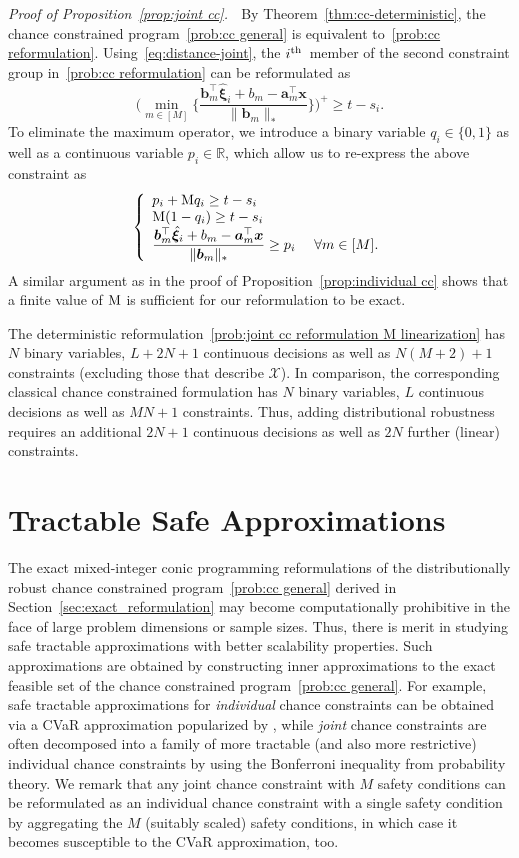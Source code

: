 \documentclass[nonblindrev]{informs2017}
\newcommand{\bmh}[1]{\hat{\bm{#1}}}
\newcommand{\1}[1]{\mathds{1}{\left(#1\right)}}
\begin{document}
\noindent \emph{Proof of Proposition~\ref{prop:joint cc}.} $\;$
By Theorem~\ref{thm:cc-deterministic}, the chance constrained program~\eqref{prob:cc general} is equivalent to~\eqref{prob:cc reformulation}. Using~\eqref{eq:distance-joint}, the $i^{\rm th}$~member of the second constraint group in~\eqref{prob:cc reformulation} can be reformulated as
$$
\bigg(\displaystyle \min_{m \in [M]} \bigg\{\dfrac{\bm{b}^\top_m\bmh{\xi}_i + b_m - \bm{a}^\top_m\bm{x}}{\|\bm{b}_m\|_*} \bigg\}\bigg)^+ \geq t - s_i.
$$
To eliminate the maximum operator, we introduce a binary variable $q_i \in \{0,1\}$ as well as a continuous variable $p_i \in \mathbb{R}$, which allow us to re-express the above constraint as
$$
\left\{
\begin{array}{ll}
p_i + {\rm M} q_i \geq t - s_i \\
{\rm M} (1 - q_i) \geq t - s_i \\
\dfrac{\bm{b}^\top_m\bmh{\xi}_i + b_m - \bm{a}^\top_m\bm{x}}{\|\bm{b}_m\|_*} \geq p_i &~\forall m \in [M].
\end{array}
\right.
$$
A similar argument as in the proof of Proposition~\ref{prop:individual cc} shows that a finite value of $\rm M$ is sufficient for our reformulation to be exact.
\hfill \Halmos
\endproof
\begin{remark}
The deterministic reformulation~\eqref{prob:joint cc reformulation M linearization} has $N$ binary variables, $L + 2 N + 1$ continuous decisions as well as $N (M + 2) + 1$ constraints (excluding those that describe $\mathcal{X}$). In comparison, the corresponding classical chance constrained formulation has $N$ binary variables, $L$ continuous decisions as well as $MN + 1$ constraints. Thus, adding distributional robustness requires an additional $2 N + 1$ continuous decisions as well as $2 N$ further (linear) constraints.
\end{remark}

\section{Tractable Safe Approximations}
The exact mixed-integer conic programming reformulations of the distributionally robust chance constrained program~\eqref{prob:cc general} derived in Section~\ref{sec:exact_reformulation} may become computationally prohibitive in the face of large problem dimensions or sample sizes. Thus, there is merit in studying safe tractable approximations with better scalability properties. Such approximations are obtained by constructing inner approximations to the exact feasible set of the chance constrained program~\eqref{prob:cc general}. For example, safe tractable approximations for {\em individual} chance constraints can be obtained via a CVaR approximation popularized by \citet{Nemirovski_Shapiro_2006}, while {\em joint} chance constraints are often decomposed into a family of more tractable (and also more restrictive) individual chance constraints by using the Bonferroni inequality from probability theory. We remark that any joint chance constraint with $M$ safety conditions can be reformulated as an individual chance constraint with a single safety condition by aggregating the $M$ (suitably scaled) safety conditions, in which case it becomes susceptible to the CVaR approximation, too.
\end{document}
